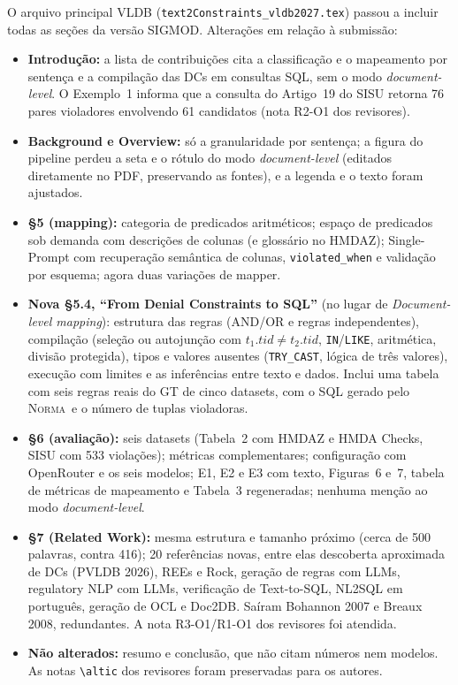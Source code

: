 \documentclass[11pt,a4paper]{article}
\newcommand{\system}{\textsc{Norma}}
\begin{document}
\noindent O arquivo principal VLDB (\texttt{text2Constraints\_vldb2027.tex}) passou a incluir todas as seções da
versão SIGMOD. Alterações em relação à submissão:
\begin{itemize}
  \item \textbf{Introdução:} a lista de contribuições cita a classificação e o mapeamento por sentença e a
        compilação das DCs em consultas SQL, sem o modo \emph{document-level}. O Exemplo~1 informa que a consulta do
        Artigo~19 do SISU retorna 76 pares violadores envolvendo 61 candidatos (nota R2-O1 dos revisores).
  \item \textbf{Background e Overview:} só a granularidade por sentença; a figura do pipeline perdeu a seta e o
        rótulo do modo \emph{document-level} (editados diretamente no PDF, preservando as fontes), e a legenda e o
        texto foram ajustados.
  \item \textbf{§5 (mapping):} categoria de predicados aritméticos; espaço de predicados sob demanda com descrições
        de colunas (e glossário no HMDAZ); Single-Prompt com recuperação semântica de colunas,
        \texttt{violated\_when} e validação por esquema; agora duas variações de mapper.
  \item \textbf{Nova §5.4, ``From Denial Constraints to SQL''} (no lugar de \emph{Document-level mapping}):
        estrutura das regras (AND/OR e regras independentes), compilação (seleção ou autojunção com
        $t_1.\mathit{tid} \neq t_2.\mathit{tid}$, \texttt{IN}/\texttt{LIKE}, aritmética, divisão protegida), tipos e
        valores ausentes (\texttt{TRY\_CAST}, lógica de três valores), execução com limites e as inferências entre
        texto e dados. Inclui uma tabela com seis regras reais do GT de cinco datasets, com o SQL gerado pelo
        \system\ e o número de tuplas violadoras.
  \item \textbf{§6 (avaliação):} seis datasets (Tabela~2 com HMDAZ e HMDA Checks, SISU com 533 violações);
        métricas complementares; configuração com OpenRouter e os seis modelos; E1, E2 e E3 com texto, Figuras~6
        e~7, tabela de métricas de mapeamento e Tabela~3 regeneradas; nenhuma menção ao modo \emph{document-level}.
  \item \textbf{§7 (Related Work):} mesma estrutura e tamanho próximo (cerca de 500 palavras, contra 416);
        20 referências novas, entre elas descoberta aproximada de DCs (PVLDB 2026), REEs e Rock, geração de regras
        com LLMs, regulatory NLP com LLMs, verificação de Text-to-SQL, NL2SQL em português, geração de OCL e Doc2DB.
        Saíram Bohannon 2007 e Breaux 2008, redundantes. A nota R3-O1/R1-O1 dos revisores foi atendida.
  \item \textbf{Não alterados:} resumo e conclusão, que não citam números nem modelos. As notas
        \texttt{\textbackslash altic} dos revisores foram preservadas para os autores.
\end{itemize}
\end{document}
